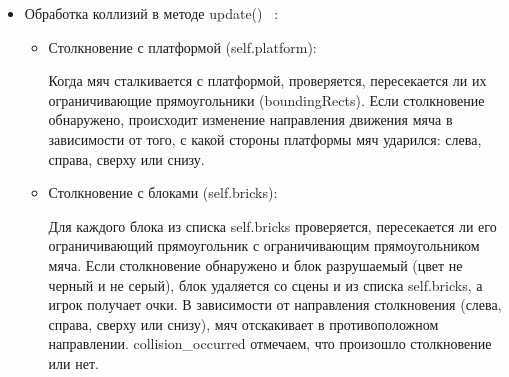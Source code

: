 \begin{itemize}
\item Обработка коллизий в методе update() ~\cite{book1author1}:
\begin{itemize}
    \item Столкновение с платформой (self.platform):
    
        Когда мяч сталкивается с платформой, проверяется, пересекается ли их ограничивающие прямоугольники (boundingRects).
        Если столкновение обнаружено, происходит изменение направления движения мяча в зависимости от того, с какой стороны платформы мяч ударился: слева, справа, сверху или снизу.

    \item Столкновение с блоками (self.bricks):
    
        Для каждого блока из списка self.bricks проверяется, пересекается ли его ограничивающий прямоугольник с ограничивающим прямоугольником мяча.
        Если столкновение обнаружено и блок разрушаемый (цвет не черный и не серый), блок удаляется со сцены и из списка self.bricks, а игрок получает очки.
        В зависимости от направления столкновения (слева, справа, сверху или снизу), мяч отскакивает в противоположном направлении.
        collision\_occurred отмечаем, что произошло столкновение или нет.
\end{itemize}
\end{itemize}

